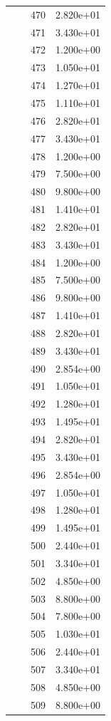 \documentclass[12pt]{article}
\begin{document}
\begin{longtable}{@{}cccc@{}}
 &  & 470 & 2.820e+01 \\
 &  & 471 & 3.430e+01 \\
 &  & 472 & 1.200e+00 \\
 &  & 473 & 1.050e+01 \\
 &  & 474 & 1.270e+01 \\
 &  & 475 & 1.110e+01 \\
 &  & 476 & 2.820e+01 \\
 &  & 477 & 3.430e+01 \\
 &  & 478 & 1.200e+00 \\
 &  & 479 & 7.500e+00 \\
 &  & 480 & 9.800e+00 \\
 &  & 481 & 1.410e+01 \\
 &  & 482 & 2.820e+01 \\
 &  & 483 & 3.430e+01 \\
 &  & 484 & 1.200e+00 \\
 &  & 485 & 7.500e+00 \\
 &  & 486 & 9.800e+00 \\
 &  & 487 & 1.410e+01 \\
 &  & 488 & 2.820e+01 \\
 &  & 489 & 3.430e+01 \\
 &  & 490 & 2.854e+00 \\
 &  & 491 & 1.050e+01 \\
 &  & 492 & 1.280e+01 \\
 &  & 493 & 1.495e+01 \\
 &  & 494 & 2.820e+01 \\
 &  & 495 & 3.430e+01 \\
 &  & 496 & 2.854e+00 \\
 &  & 497 & 1.050e+01 \\
 &  & 498 & 1.280e+01 \\
 &  & 499 & 1.495e+01 \\
 &  & 500 & 2.440e+01 \\
 &  & 501 & 3.340e+01 \\
 &  & 502 & 4.850e+00 \\
 &  & 503 & 8.800e+00 \\
 &  & 504 & 7.800e+00 \\
 &  & 505 & 1.030e+01 \\
 &  & 506 & 2.440e+01 \\
 &  & 507 & 3.340e+01 \\
 &  & 508 & 4.850e+00 \\
 &  & 509 & 8.800e+00 \\

\end{longtable}
\end{document}
